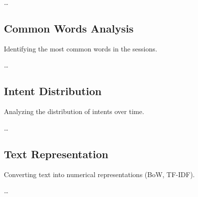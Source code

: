        \ldots

    \subsection{Common Words Analysis}
    
        Identifying the most common words in the sessions.

        \ldots

    \subsection{Intent Distribution}
            
        Analyzing the distribution of intents over time.

        \ldots

    \subsection{Text Representation}
    
        Converting text into numerical representations (BoW, TF-IDF).

        \ldots
